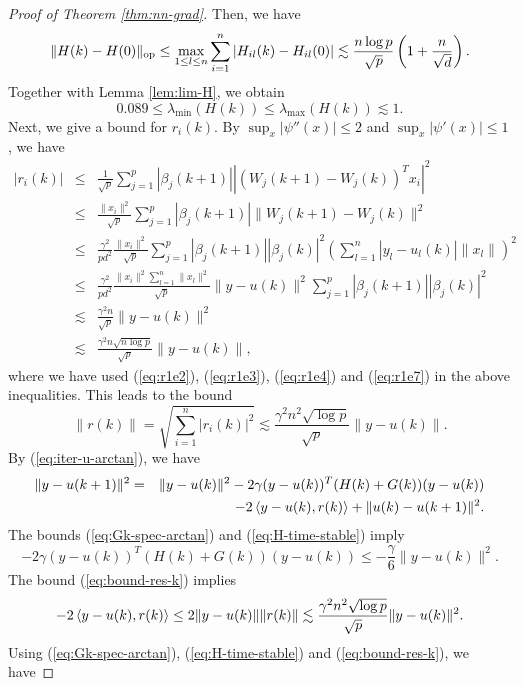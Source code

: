 \begin{proof}[Proof of Theorem \ref{thm:nn-grad}]
Then, we have
$$
\|H(k)-H(0)\|_{\rm op}\leq \max_{1\leq l\leq n}\sum_{i=1}^n|H_{il}(k) - H_{il}(0)|\lesssim \frac{n\log p}{\sqrt{p}}\left(1+\frac{n}{\sqrt{d}}\right).
$$
Together with Lemma \ref{lem:lim-H}, we obtain
\begin{equation}
0.089 \leq \lambda_{\min}(H(k)) \leq \lambda_{\max}(H(k)) \lesssim 1. \label{eq:H-time-stable}
\end{equation}
Next, we give a bound for $r_i(k)$. By $\sup_x|\psi''(x)|\leq 2$ and $\sup_x|\psi'(x)|\leq 1$, we have
\begin{eqnarray*}
|r_i(k)| &\leq& \frac{1}{\sqrt{p}}\sum_{j=1}^p|\beta_j(k+1)||(W_j(k+1)-W_j(k))^Tx_i|^2 \\
&\leq& \frac{\|x_i\|^2}{\sqrt{p}}\sum_{j=1}^p|\beta_j(k+1)|\|W_j(k+1)-W_j(k)\|^2 \\
&\leq& \frac{\gamma^2}{pd^2}\frac{\|x_i\|^2}{\sqrt{p}}\sum_{j=1}^p|\beta_j(k+1)||\beta_j(k)|^2\left(\sum_{l=1}^n|y_l-u_l(k)|\|x_l\|\right)^2 \\
&\leq& \frac{\gamma^2}{pd^2}\frac{\|x_i\|^2\sum_{l=1}^n\|x_l\|^2}{\sqrt{p}}\|y-u(k)\|^2\sum_{j=1}^p|\beta_j(k+1)||\beta_j(k)|^2 \\
&\lesssim& \frac{\gamma^2n}{\sqrt{p}}\|y-u(k)\|^2 \\
&\lesssim& \frac{\gamma^2n\sqrt{n\log p}}{\sqrt{p}}\|y-u(k)\|,
\end{eqnarray*}
where we have used (\ref{eq:r1e2}), (\ref{eq:r1e3}), (\ref{eq:r1e4}) and (\ref{eq:r1e7}) in the above inequalities.
This leads to the bound
\begin{equation}
\|r(k)\|=\sqrt{\sum_{i=1}^n|r_i(k)|^2}\lesssim \frac{\gamma^2n^2\sqrt{\log p}}{\sqrt{p}}\|y-u(k)\|.\label{eq:bound-res-k}
\end{equation}
By (\ref{eq:iter-u-arctan}), we have
\begin{eqnarray*}
\|y-u(k+1)\|^2
&=& \|y-u(k)\|^2 - 2\gamma(y-u(k))^T(H(k)+G(k))(y-u(k)) \\
&& - 2\iprod{y-u(k)}{r(k)} + \|u(k)-u(k+1)\|^2.
\end{eqnarray*}
The bounds (\ref{eq:Gk-spec-arctan}) and (\ref{eq:H-time-stable}) imply
\begin{equation}
- 2\gamma(y-u(k))^T(H(k)+G(k))(y-u(k)) \leq -\frac{\gamma}{6}\|y-u(k)\|^2. \label{eq:main-inner}
\end{equation}
The bound (\ref{eq:bound-res-k}) implies
$$- 2\left \langle y-u(k), r(k) \right\rangle\leq 2\|y-u(k)\|\|r(k)\|\lesssim \frac{\gamma^2n^2\sqrt{\log p}}{\sqrt{p}}\|y-u(k)\|^2.$$
Using (\ref{eq:Gk-spec-arctan}), (\ref{eq:H-time-stable}) and (\ref{eq:bound-res-k}), we have

\end{proof}
